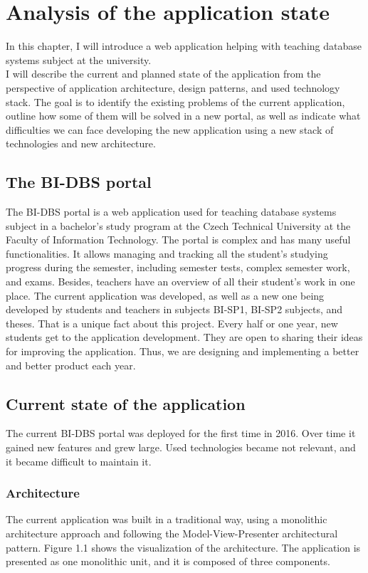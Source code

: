 \chapter{Analysis of the application state}

In this chapter, I will introduce a web application helping with teaching database systems subject at the university. \\
I will describe the current and planned state of the application from the perspective of application architecture, design patterns, and used technology stack. The goal is to identify the existing problems of the current application, outline how some of them will be solved in a new portal, as well as indicate what difficulties we can face developing the new application using a new stack of technologies and new architecture.

\section{The BI-DBS portal}
The BI-DBS portal is a web application used for teaching database systems subject in a bachelor's study program at the Czech Technical University at the Faculty of Information Technology. The portal is complex and has many useful functionalities. It allows managing and tracking all the student's studying progress during the semester, including semester tests, complex semester work, and exams. Besides, teachers have an overview of all their student's work in one place.
The current application was developed, as well as a new one being developed by students and teachers in subjects BI-SP1, BI-SP2 subjects, and theses. That is a unique fact about this project. Every half or one year, new students get to the application development. They are open to sharing their ideas for improving the application. Thus, we are designing and implementing a better and better product each year.


\section{Current state of the application}
The current BI-DBS portal was deployed for the first time in 2016. Over time it gained new features and grew large. Used technologies became not relevant, and it became difficult to maintain it. 

\subsection{Architecture}
The current application was built in a traditional way, using a monolithic architecture approach and following the Model-View-Presenter architectural pattern\cite{potel_mvp}. Figure 1.1 shows the visualization of the architecture. The application is presented as one monolithic unit, and it is composed  of three components.

